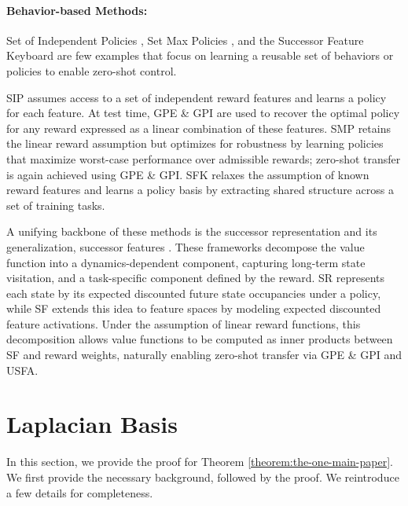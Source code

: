 \documentclass{article}
\theoremstyle{plain}
\theoremstyle{definition}
\theoremstyle{remark}
\begin{document}
\paragraph{Behavior-based Methods:}

Set of Independent Policies \citep[SIP;][]{alver2022sip}, Set Max Policies \citep[SMP;][]{zahavy2021discovering}, and the Successor Feature Keyboard \citep[SFK;][]{carvalho2023combining} are few examples that focus on learning a reusable set of behaviors or policies to enable zero-shot control.

SIP assumes access to a set of independent reward features and learns a policy for each feature. At test time, GPE \& GPI are used to recover the optimal policy for any reward expressed as a linear combination of these features. SMP retains the linear reward assumption but optimizes for robustness by learning policies that maximize worst-case performance over admissible rewards; zero-shot transfer is again achieved using GPE \& GPI. SFK relaxes the assumption of known reward features and learns a policy basis by extracting shared structure across a set of training tasks.


\vspace{10pt}

A unifying backbone of these methods is the successor representation \citep[SR;][]{dayan1993improving} and its generalization, successor features \citep[SF;][]{barreto2017successor}. These frameworks decompose the value function into a dynamics-dependent component, capturing long-term state visitation, and a task-specific component defined by the reward. SR represents each state by its expected discounted future state occupancies under a policy, while SF extends this idea to feature spaces by modeling expected discounted feature activations. Under the assumption of linear reward functions, this decomposition allows value functions to be computed as inner products between SF and reward weights, naturally enabling zero-shot transfer via GPE \& GPI and USFA.



\newpage

\section{Laplacian Basis}

In this section, we provide the proof for Theorem \ref{theorem:the-one-main-paper}. We first provide the necessary background, followed by the proof. We reintroduce a few details for completeness. 
\end{document}
